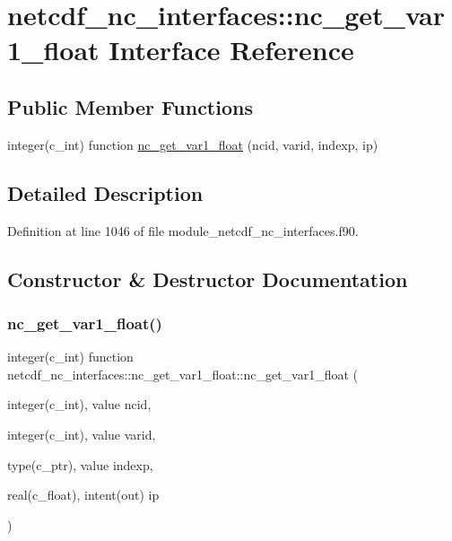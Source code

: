 \hypertarget{interfacenetcdf__nc__interfaces_1_1nc__get__var1__float}{}\section{netcdf\+\_\+nc\+\_\+interfaces\+:\+:nc\+\_\+get\+\_\+var1\+\_\+float Interface Reference}
\label{interfacenetcdf__nc__interfaces_1_1nc__get__var1__float}
\subsection*{Public Member Functions}
\begin{DoxyCompactItemize}
\item 
integer(c\+\_\+int) function \hyperlink{interfacenetcdf__nc__interfaces_1_1nc__get__var1__float_a26a93f97da20f35c6a4568aab73f99ab}{nc\+\_\+get\+\_\+var1\+\_\+float} (ncid, varid, indexp, ip)
\end{DoxyCompactItemize}


\subsection{Detailed Description}


Definition at line 1046 of file module\+\_\+netcdf\+\_\+nc\+\_\+interfaces.\+f90.



\subsection{Constructor \& Destructor Documentation}
\mbox{\label{interfacenetcdf__nc__interfaces_1_1nc__get__var1__float_a26a93f97da20f35c6a4568aab73f99ab}} 
\subsubsection{\texorpdfstring{nc\+\_\+get\+\_\+var1\+\_\+float()}{nc\_get\_var1\_float()}}
{\footnotesize\ttfamily integer(c\+\_\+int) function netcdf\+\_\+nc\+\_\+interfaces\+::nc\+\_\+get\+\_\+var1\+\_\+float\+::nc\+\_\+get\+\_\+var1\+\_\+float (\begin{DoxyParamCaption}\item[{integer(c\+\_\+int), value}]{ncid,  }\item[{integer(c\+\_\+int), value}]{varid,  }\item[{type(c\+\_\+ptr), value}]{indexp,  }\item[{real(c\+\_\+float), intent(out)}]{ip }\end{DoxyParamCaption})}



